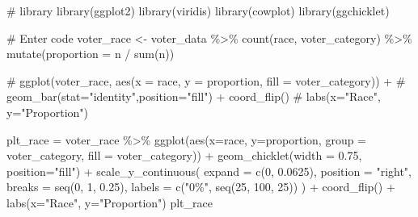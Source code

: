 \documentclass[
  letterpaper,
  DIV=11,
  numbers=noendperiod]{scrartcl}
\newenvironment{Shaded}{\begin{snugshade}}{\end{snugshade}}
\newcommand{\AttributeTok}[1]{\textcolor[rgb]{0.40,0.45,0.13}{#1}}
\newcommand{\CommentTok}[1]{\textcolor[rgb]{0.37,0.37,0.37}{#1}}
\newcommand{\DecValTok}[1]{\textcolor[rgb]{0.68,0.00,0.00}{#1}}
\newcommand{\FloatTok}[1]{\textcolor[rgb]{0.68,0.00,0.00}{#1}}
\newcommand{\FunctionTok}[1]{\textcolor[rgb]{0.28,0.35,0.67}{#1}}
\newcommand{\NormalTok}[1]{\textcolor[rgb]{0.00,0.23,0.31}{#1}}
\newcommand{\OtherTok}[1]{\textcolor[rgb]{0.00,0.23,0.31}{#1}}
\newcommand{\SpecialCharTok}[1]{\textcolor[rgb]{0.37,0.37,0.37}{#1}}
\newcommand{\StringTok}[1]{\textcolor[rgb]{0.13,0.47,0.30}{#1}}
\begin{document}
\begin{Shaded}
\begin{Highlighting}[]
\CommentTok{\# library}
\FunctionTok{library}\NormalTok{(ggplot2)}
\FunctionTok{library}\NormalTok{(viridis)}
\FunctionTok{library}\NormalTok{(cowplot)}
\FunctionTok{library}\NormalTok{(ggchicklet)}

\CommentTok{\# Enter code}
\NormalTok{voter\_race }\OtherTok{\textless{}{-}}\NormalTok{ voter\_data }\SpecialCharTok{\%\textgreater{}\%}
  \FunctionTok{count}\NormalTok{(race, voter\_category) }\SpecialCharTok{\%\textgreater{}\%}
  \FunctionTok{mutate}\NormalTok{(}\AttributeTok{proportion =}\NormalTok{ n }\SpecialCharTok{/} \FunctionTok{sum}\NormalTok{(n))}

\CommentTok{\# ggplot(voter\_race, aes(x = race, y = proportion, fill = voter\_category)) +}
\CommentTok{\#  geom\_bar(stat="identity",position="fill") + coord\_flip()}
\CommentTok{\#   labs(x="Race", y="Proportion")}

\NormalTok{plt\_race }\OtherTok{=}\NormalTok{ voter\_race }\SpecialCharTok{\%\textgreater{}\%}
  \FunctionTok{ggplot}\NormalTok{(}\FunctionTok{aes}\NormalTok{(}\AttributeTok{x=}\NormalTok{race, }\AttributeTok{y=}\NormalTok{proportion, }\AttributeTok{group =}\NormalTok{ voter\_category, }\AttributeTok{fill =}\NormalTok{ voter\_category)) }\SpecialCharTok{+}
  \FunctionTok{geom\_chicklet}\NormalTok{(}\AttributeTok{width =} \FloatTok{0.75}\NormalTok{, }\AttributeTok{position=}\StringTok{"fill"}\NormalTok{)  }\SpecialCharTok{+} 
  \FunctionTok{scale\_y\_continuous}\NormalTok{(}
    \AttributeTok{expand =} \FunctionTok{c}\NormalTok{(}\DecValTok{0}\NormalTok{, }\FloatTok{0.0625}\NormalTok{),}
    \AttributeTok{position =} \StringTok{"right"}\NormalTok{,}
    \AttributeTok{breaks =} \FunctionTok{seq}\NormalTok{(}\DecValTok{0}\NormalTok{, }\DecValTok{1}\NormalTok{, }\FloatTok{0.25}\NormalTok{),}
    \AttributeTok{labels =} \FunctionTok{c}\NormalTok{(}\StringTok{"0\%"}\NormalTok{, }\FunctionTok{seq}\NormalTok{(}\DecValTok{25}\NormalTok{, }\DecValTok{100}\NormalTok{, }\DecValTok{25}\NormalTok{))}
\NormalTok{  ) }\SpecialCharTok{+}
  \FunctionTok{coord\_flip}\NormalTok{() }\SpecialCharTok{+} 
  \FunctionTok{labs}\NormalTok{(}\AttributeTok{x=}\StringTok{"Race"}\NormalTok{, }\AttributeTok{y=}\StringTok{"Proportion"}\NormalTok{)}
\NormalTok{plt\_race}
\end{Highlighting}
\end{Shaded}
\end{document}
